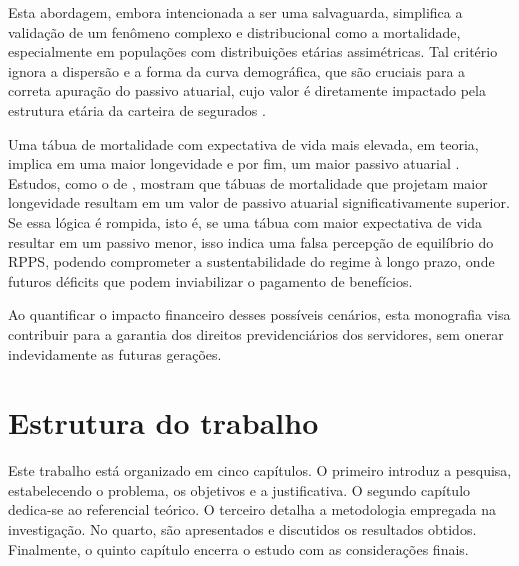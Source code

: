 Esta abordagem, embora intencionada a ser uma salvaguarda, simplifica a validação de um fenômeno complexo e distribucional como a mortalidade, especialmente em populações com distribuições etárias assimétricas. Tal critério ignora a dispersão e a forma da curva demográfica, que são cruciais para a correta apuração do passivo atuarial, cujo valor é diretamente impactado pela estrutura etária da carteira de segurados \cite{junior2019mortalidade}.

Uma tábua de mortalidade com expectativa de vida mais elevada, em teoria, implica em uma maior longevidade e por fim, um maior passivo atuarial \cite{silveira_santos_2017}. Estudos, como o de , mostram que tábuas de mortalidade que projetam maior longevidade resultam em um valor de passivo atuarial significativamente superior. Se essa lógica é rompida, isto é, se uma tábua com maior expectativa de vida resultar em um passivo menor, isso indica uma falsa percepção de equilíbrio do RPPS, podendo comprometer a sustentabilidade do regime à longo prazo, onde futuros déficits que podem inviabilizar o pagamento de benefícios.

Ao quantificar o impacto financeiro desses possíveis cenários, esta monografia visa contribuir para a garantia dos direitos previdenciários dos servidores, sem onerar indevidamente as futuras gerações.

\section{\textbf{Estrutura do trabalho}}
Este trabalho está organizado em cinco capítulos. O primeiro introduz a pesquisa, estabelecendo o problema, os objetivos e a justificativa. O segundo capítulo dedica-se ao referencial teórico. O terceiro detalha a metodologia empregada na investigação. No quarto, são apresentados e discutidos os resultados obtidos. Finalmente, o quinto capítulo encerra o estudo com as considerações finais.